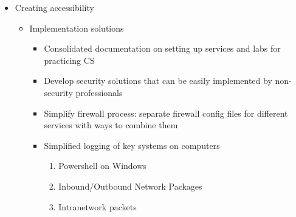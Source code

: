 \documentclass[openright]{report}
\begin{document}
\begin{appendices}
\begin{itemize}
\begin{itemize}
\begin{itemize}
\begin{itemize}
\begin{adjustwidth}{2.5em}{0pt}
\begin{enumerate}
                                    \item Makes it easier to set up
                                    \item More competitions
                                \end{enumerate}
                            \end{adjustwidth}
                            \item Simplify and reduce costs of competitions like CCDC
                            \item CS videogames downloadable from windows store/steam
                            \item IoT CS - teach cyber concepts through \$50 toy
                        \end{itemize}
                    \item Start a major CTF for CS and promote it at the high school and college levels
                \end{itemize}
            \item Creating accessibility
                \begin{itemize}
                    \item Implementation solutions
                        \begin{itemize}
                            \item Consolidated documentation on setting up services and labs for practicing CS
                            \item Develop security solutions that can be easily implemented by non-security professionals
                            \item Simplify firewall process: separate firewall config files for different services with ways to combine them
                            \item Simplified logging of key systems on computers
                                \begin{adjustwidth}{2.5em}{0pt}
                                    \begin{enumerate}
                                        \item Powershell on Windows
                                        \item Inbound/Outbound Network Packages
                                        \item Intranetwork packets
                                    \end{enumerate}

\end{adjustwidth}
\end{itemize}
\end{itemize}
\end{itemize}
\end{itemize}
\end{appendices}
\end{document}
